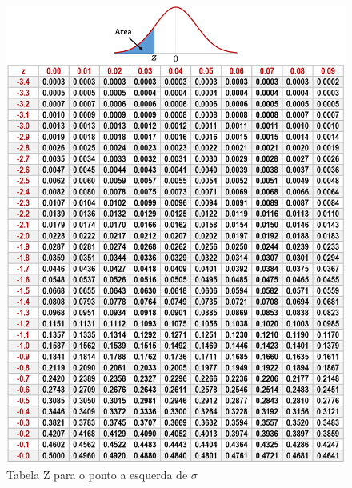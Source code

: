 \documentclass[a4paper,11pt]{article}
\begin{document}
\newpage
\begin{figure}[!htb]
	\centering
	\includegraphics[width=1.0\textwidth]{imagens/ztable.png}
	\caption{Tabela Z para o ponto a esquerda de $\sigma$}
\end{figure}
\end{document}
